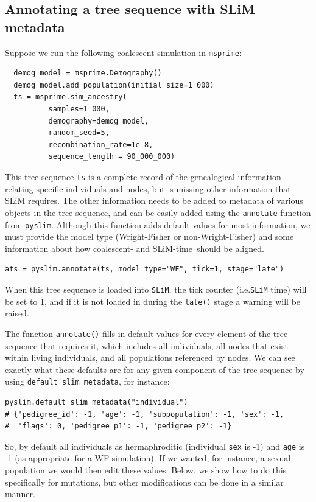 \documentclass[12pt]{article}
\newcommand{\msprime}[0]{\texttt{msprime}\xspace}
\newcommand{\slim}[0]{\texttt{SLiM}\xspace}
\newcommand{\pyslim}[0]{\texttt{pyslim}\xspace}
\newcommand*{\ie}{i.e.\xcomma}
\begin{document}
\subsection*{Annotating a tree sequence with SLiM metadata}

Suppose we run the following coalescent simulation in \msprime:
\begin{verbatim}
  demog_model = msprime.Demography()
  demog_model.add_population(initial_size=1_000)
  ts = msprime.sim_ancestry(
          samples=1_000,
          demography=demog_model,
          random_seed=5,
          recombination_rate=1e-8,
          sequence_length = 90_000_000)
\end{verbatim}
This tree sequence \verb|ts| is a complete record of the genealogical information relating specific individuals
and nodes, but is missing other information that  SLiM requires.
The other information needs to be added to metadata of various objects in the tree sequence,
and can be easily added using the \verb|annotate| function from \pyslim.
Although this function adds default values for most information,
we must provide the model type (Wright-Fisher or non-Wright-Fisher)
and some information about how coalescent- and SLiM-time\ should be aligned.
\begin{verbatim}
ats = pyslim.annotate(ts, model_type="WF", tick=1, stage="late")
\end{verbatim}
When this tree sequence is loaded into \slim, the tick counter (\ie \slim time)
will be set to 1, and if it is not loaded in during the \verb|late()| stage a warning will be raised.

The function \verb|annotate()| fills in default values for every element of the tree sequence that requires it,
which includes all individuals, all nodes that exist within living individuals, and all
populations referenced by nodes. We can see exactly what these defaults
are for any given component of the tree sequence by using \verb|default_slim_metadata|,
for instance:
\begin{verbatim}
pyslim.default_slim_metadata("individual")
# {'pedigree_id': -1, 'age': -1, 'subpopulation': -1, 'sex': -1,
#  'flags': 0, 'pedigree_p1': -1, 'pedigree_p2': -1}
\end{verbatim}
So, by default all individuals as hermaphroditic (individual \verb|sex| is -1)
and \verb|age| is -1 (as appropriate for a WF simulation).
If we wanted, for instance, a sexual population we would then edit these values.
Below, we show how to do this specifically for mutations, but other modifications
can be done in a similar manner.
\end{document}
